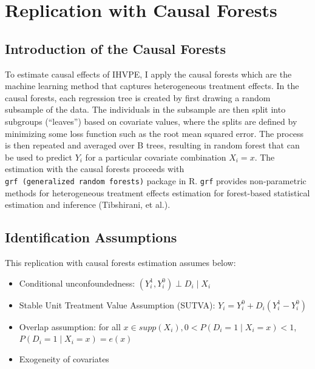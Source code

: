 \documentclass[11pt,a4paper]{article}
\begin{document}
\hypertarget{replication-with-causal-forests}{%
\section{Replication with Causal
Forests}\label{replication-with-causal-forests}}

\hypertarget{introduction-of-the-causal-forests}{%
\subsection{Introduction of the Causal
Forests}\label{introduction-of-the-causal-forests}}

To estimate causal effects of IHVPE, I apply the causal forests which
are the machine learning method that captures heterogeneous treatment
effects. In the causal forests, each regression tree is created by first
drawing a random subsample of the data. The individuals in the subsample
are then split into subgroups (``leaves'') based on covariate values,
where the splits are defined by minimizing some loss function such as
the root mean squared error. The process is then repeated and averaged
over B trees, resulting in random forest that can be used to predict
\(Y_i\) for a particular covariate combination \(X_i = x\). The
estimation with the causal forests proceeds with
\texttt{grf\ (generalized\ random\ forests)} package in R. \texttt{grf}
provides non-parametric methods for heterogeneous treatment effects
estimation for forest-based statistical estimation and inference
(Tibshirani, et al.).

\hypertarget{identification-assumptions}{%
\subsection{Identification Assumptions}\label{identification-assumptions}}

This replication with causal forests estimation assumes below:
\begin{itemize}
\item Conditional unconfoundedness: $(Y_i^1, Y_i^0) \perp D_i \mid X_i$ \\
\item Stable Unit Treatment Value Assumption (SUTVA): $Y_i=Y_i^0+D_i(Y_i^1-Y_i^0)$ \\
\item Overlap assumption: for all $x \in supp(X_i), 0<P(D_i=1 \mid X_i=x)<1$, $P(D_i = 1 \mid X_i = x) = e(x)$ \\
\item Exogeneity of covariates
\end{itemize}
\end{document}
